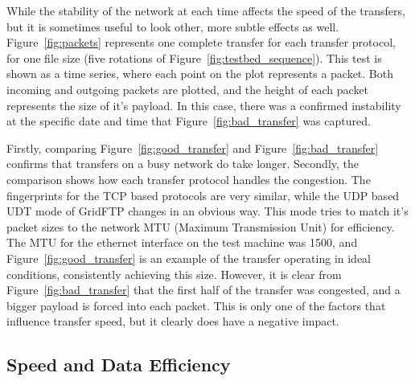 \documentclass{sig-alternate-05-2015}
\begin{document}
While the stability of the network at each time affects the speed of the transfers, but it is sometimes useful to look other, more subtle effects as well. Figure~\ref{fig:packets} represents  one complete transfer for each transfer protocol, for one file size (five rotations of Figure~\ref{fig:testbed_sequence}). This test is shown as a time series, where each point on the plot represents a packet. Both incoming and outgoing packets are plotted, and the height of each packet represents the size of it's payload. In this case, there was a confirmed instability at the specific date and time that Figure~\ref{fig:bad_transfer} was captured.

Firstly, comparing Figure~\ref{fig:good_transfer} and Figure~\ref{fig:bad_transfer} confirms that transfers on a busy network do take longer. Secondly, the comparison shows how each transfer protocol handles the congestion. The fingerprints for the TCP based protocols are very similar, while the UDP based UDT mode of GridFTP changes in an obvious way. This mode tries to match it's packet sizes to the network MTU (Maximum Transmission Unit) for efficiency. The MTU for the ethernet interface on the test machine was 1500, and Figure~\ref{fig:good_transfer} is an example of the transfer operating in ideal conditions, consistently achieving this size. However, it is clear from Figure~\ref{fig:bad_transfer} that the first half of the transfer was congested, and a bigger payload is forced into each packet. This is only one of the factors that influence transfer speed, but it clearly does have a negative impact.

\subsection{Speed and Data Efficiency}
\end{document}
